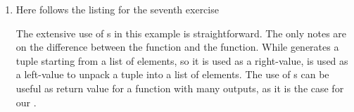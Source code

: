 \begin{enumerate}
    \item Here follows the listing for the seventh exercise 
    \lstset{basicstyle=\scriptsize\sf}
    
    \lstset{basicstyle=\sf}
    The extensive use of s in this example is straightforward. The
    only notes are on the difference between the  function and
    the  function. While  generates a tuple starting 
    from a list of elements, so it is used as a right-value,  is used
    as a left-value to unpack a tuple into a list of elements. The use of
    s can be useful as return value for a function with many outputs,
    as it is the case for our .

\end{enumerate}
